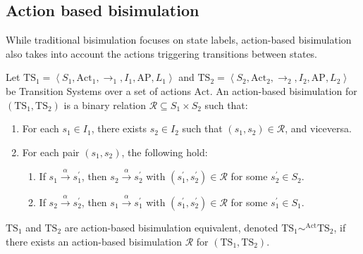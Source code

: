 \subsection{Action based bisimulation}
While traditional bisimulation focuses on state labels, action-based bisimulation also takes into account the actions triggering transitions between states.
\begin{definition}
    Let $\text{TS}_1=\left\langle S_1,\text{Act}_1,\rightarrow_1,I_1,\text{AP},L_1\right\rangle$ and $\text{TS}_2=\left\langle S_2,\text{Act}_2,\rightarrow_2,I_2,\text{AP},L_2\right\rangle$ be Transition Systems over a set of actions $\text{Act}$.
    An action-based bisimulation for $(\text{TS}_1,\text{TS}_2)$ is a binary relation $\mathcal{R}\subseteq S_1\times S_2$ such that: 
    \begin{enumerate}
        \item For each $s_1\in I_1$, there exists $s_2\in I_2$ such that $(s_1,s_2)\in\mathcal{R}$, and viceversa.
        \item For each pair $(s_1,s_2)$, the following hold:
            \begin{enumerate}
                \item If $s_1\xrightarrow{\alpha}s_1^\prime$, then $s_2\xrightarrow{\alpha}s_2^\prime$ with $(s_1^\prime,s_2^\prime)\in\mathcal{R}$ for some $s_2^\prime\in S_2$.
                \item If $s_2\xrightarrow{\alpha}s_2^\prime$, then $s_1\xrightarrow{\alpha}s_1^\prime$ with $(s_1^\prime,s_2^\prime)\in\mathcal{R}$ for some $s_1^\prime\in S_1$.
            \end{enumerate}
    \end{enumerate}
    $\text{TS}_1$ and $\text{TS}_2$ are action-based bisimulation equivalent, denoted $\text{TS}_1\sim^{\text{Act}}\text{TS}_2$, if there exists an action-based bisimulation $\mathcal{R}$ for $(\text{TS}_1,\text{TS}_2)$.
\end{definition}